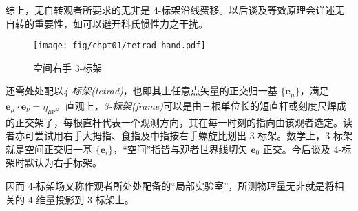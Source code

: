 综上，无自转观者所要求的无非是 4-标架沿线费移。以后谈及等效原理会详述无自转的重要性，如可以避开科氏惯性力之干扰。

\begin{wrapfigure}{l}{.35\textwidth}
    \texttt{[image: fig/chpt01/tetrad hand.pdf]}
    \caption{空间右手 3-标架}
\end{wrapfigure}
还需处处配以\textit{4-标架(tetrad)}，也即其上任意点矢量的正交归一基 $\{\bm{e}_\mu\}$，满足 $\bm{e}_\mu\cdot\bm{e}_\nu=\eta_{\mu\nu}$。直观上，\textit{3-标架(frame)}可以是由三根单位长的短直杆或刻度尺焊成的正交架子，每根直杆代表一个观测方向，其在每一时刻的指向由该观者选定。读者亦可尝试用右手大拇指、食指及中指按右手螺旋比划出 3-标架。数学上，3-标架就是空间正交归一基 $\{\bm{e}_i\}$，“空间”指皆与观者世界线切矢 $\bm{e}_0$ 正交。今后谈及 4-标架时默认为右手标架。



因而 4-标架场又称作观者所处处配备的“局部实验室”，所测物理量无非就是将相关的 4 维量投影到 3-标架上。


